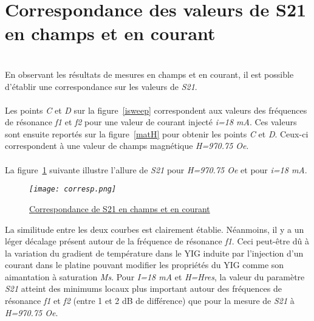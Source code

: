 \documentclass[12pt,fleqn]{book} %
\begin{document}
\section{Correspondance des valeurs de S21 en champs et en courant}
~\\\noindent En observant les résultats de mesures en champs et en courant, il est possible d'établir une correspondance sur les valeurs de \emph{S21}.
~\\\\Les points \emph{C} et \emph{D} sur la figure~\underline{\color{blue}\ref{isweep}} correspondent aux valeurs des fréquences de résonance \emph{f1} et \emph{f2} pour une valeur de courant injecté \emph{i=18 mA}. Ces valeurs sont ensuite reportés sur la figure~\underline{\color{blue}\ref{matH}} pour obtenir les points \emph{C} et \emph{D}. Ceux-ci correspondent à une valeur de champs magnétique \emph{H=970.75 Oe}.
~\\\\La figure~\underline{\color{blue}\ref{corresp}} suivante illustre l'allure de \emph{S21} pour \emph{H=970.75 Oe} et pour \emph{i=18 mA}.
\begin{figure}[H]
	\centering
	\itshape
	\texttt{[image: corresp.png]}
	\caption{\label{corresp} \underline{Correspondance de S21 en champs et en courant}}
\end{figure}
\noindent La similitude entre les deux courbes est clairement établie. Néanmoins, il y a un léger décalage présent autour de la fréquence de résonance \emph{f1}. Ceci peut-être dû à la variation du gradient de température dans le YIG induite par l'injection d'un courant dans le platine pouvant modifier les propriétés du YIG comme son aimantation à saturation \emph{Ms}.
Pour \emph{I=18 mA} et \emph{H=Hres}, la valeur du paramètre \emph{S21} atteint des minimums locaux plus important autour des fréquences de résonance \emph{f1} et \emph{f2} (entre 1 et 2 dB de différence) que pour la mesure de \emph{S21} à \emph{H=970.75 Oe}.
\end{document}
